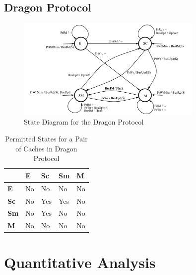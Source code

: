 \documentclass[nonacm,acmsmall,screen,11pt]{acmart}
\begin{document}
\subsection{Dragon Protocol}
\begin{figure}[htb!]
  \centering
  \includegraphics[width=0.8\textwidth]{dragon}
  \caption{State Diagram for the Dragon Protocol}
\end{figure}

\begin{table}[htb!]
  \centering
  \caption{Permitted States for a Pair of Caches in Dragon Protocol}
  \label{tab:dragon}
  \begin{tabular}{|l|l|l|l|l|}
    \hline
                & \textbf{E} & \textbf{Sc} & \textbf{Sm} & \textbf{M} \\ \hline
    \textbf{E}  & No         & No          & No          & No         \\ \hline
    \textbf{Sc} & No         & Yes         & Yes         & No         \\ \hline
    \textbf{Sm} & No         & Yes         & No          & No         \\ \hline
    \textbf{M}  & No         & No          & No          & No         \\ \hline
  \end{tabular}
\end{table}

\section{Quantitative Analysis}
\end{document}
